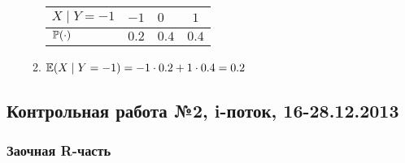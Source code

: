 \begin{enumerate}
\begin{enumerate}
\begin{tabular}{@{}lclc@{}}
\toprule
$ X \mid Y=-1$ & $-1$  & $0$   & $1$   \\ \midrule
$\P(\cdot)$    & $0.2$ & $0.4$ & $0.4$ \\ \bottomrule
\end{tabular}

\item $\E(X \mid Y=-1) = -1 \cdot 0.2 + 1 \cdot 0.4 = 0.2$
\end{enumerate}
\end{enumerate}



\subsection{Контрольная работа №2, i-поток, 16-28.12.2013}

\subsubsection*{Заочная R-часть}

